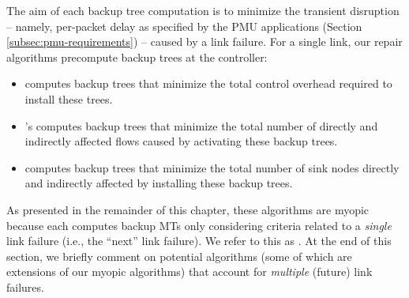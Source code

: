 The aim of each backup tree computation is to minimize the transient disruption -- namely, per-packet delay as specified by the PMU applications (Section \ref{subsec:pmu-requirements}) -- caused by a link failure.  
For a single link, our repair algorithms precompute backup trees at the controller:
\vspace{-0.3cm}
\begin{itemize}
	\item \mc computes backup trees that minimize the total control overhead required to install these trees. 

	\item \mfs's computes backup trees that minimize the total number of directly and indirectly affected flows caused by activating these backup trees. 

	\item  \md computes backup trees that minimize the total number of sink nodes directly and indirectly affected by installing these backup trees.

\end{itemize}
\vspace{-0.3cm}
		



As presented in the remainder of this chapter, these algorithms are myopic because each computes backup MTs only considering criteria related to a \emph{single} link failure (i.e., the ``next'' link failure). 
We refer to this as \myopics.
At the end of this section, we briefly comment on potential algorithms (some of which are extensions of our myopic algorithms) that account for \emph{multiple} (future) link failures.

